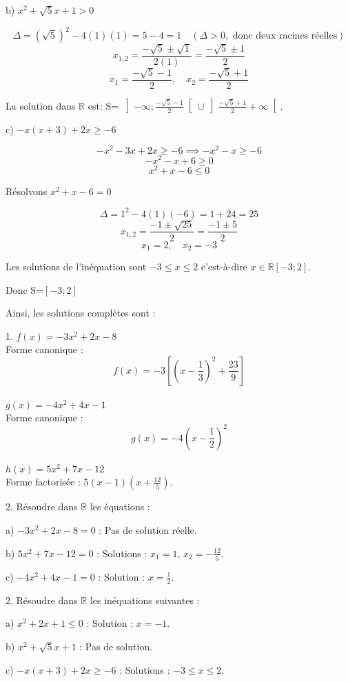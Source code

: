 \documentclass[12pt]{article}
\begin{document}
b) \( x^{2} + \sqrt{5} x + 1 >0 \)

\[
\Delta = (\sqrt{5})^2 - 4(1)(1) = 5 - 4 = 1 \quad (\Delta > 0, \text{ donc deux racines réelles})
\]
\[
x_{1,2} = \frac{-\sqrt{5} \pm \sqrt{1}}{2(1)} = \frac{-\sqrt{5} \pm 1}{2}
\]
\[
x_1 = \frac{-\sqrt{5} - 1}{2}, \quad x_2 = \frac{-\sqrt{5} + 1}{2}
\]

La solution dans \(\mathbb{R}\) est: S= \( \left]-\infty ; \frac{-\sqrt{5} - 1}{2} \right[ \cup \left]\frac{-\sqrt{5} + 1}{2} +\infty\right[ \).

c) \( -x(x + 3) + 2x \geq -6 \)

\[
-x^2 - 3x + 2x \geq -6 \implies -x^2 - x \geq -6
\]
\[
-x^2 - x + 6 \geq 0
\]
\[
x^2 + x - 6 \leq 0
\]

Résolvons \( x^2 + x - 6 = 0 \)

\[
\Delta = 1^2 - 4(1)(-6) = 1 + 24 = 25
\]
\[
x_{1,2} = \frac{-1 \pm \sqrt{25}}{2} = \frac{-1 \pm 5}{2}
\]
\[
x_1 = 2, \quad x_2 = -3
\]

Les solutions de l'inéquation sont \( -3 \leq x \leq 2 \) c'est-à-dire $x\in\mathbb{R}\left[ -3 ; 2\right] $.

Donc S=$\left[ -3 ; 2\right]$

Ainsi, les solutions complètes sont :

1. \( f(x) = -3x^{2} + 2x - 8 \) \\
Forme canonique : \[
f(x) = -3\left[ \left(x - \frac{1}{3}\right)^{2} + \frac{23}{9}\right] 
\]\\

\( g(x) = -4x^{2} + 4x - 1 \) \\
Forme canonique : \[
g(x) = -4\left(x - \frac{1}{2}\right)^{2}
\] \\

\( h(x) = 5x^{2} + 7x - 12 \) \\
Forme factorisée : \( 5(x - 1)(x + \frac{12}{5}) \).

2. Résoudre dans \(\mathbb{R}\) les équations :

a) \( -3x^{2} + 2x - 8 = 0 \) : Pas de solution réelle.

b) \( 5x^{2} + 7x - 12 = 0 \) : Solutions : \( x_1 = 1 \), \( x_2 = -\frac{12}{5} \).

c) \( -4x^{2} + 4x - 1 = 0 \) : Solution : \( x = \frac{1}{2} \).

2. Résoudre dans \(\mathbb{R}\) les inéquations suivantes :

a) \( x^{2} + 2x + 1 \leq 0 \) : Solution : \( x = -1 \).

b) \( x^{2} + \sqrt{5} x + 1 \) : Pas de solution.

c) \( -x(x + 3) + 2x \geq -6 \) : Solutions : \( -3 \leq x \leq 2 \).
\end{document}

